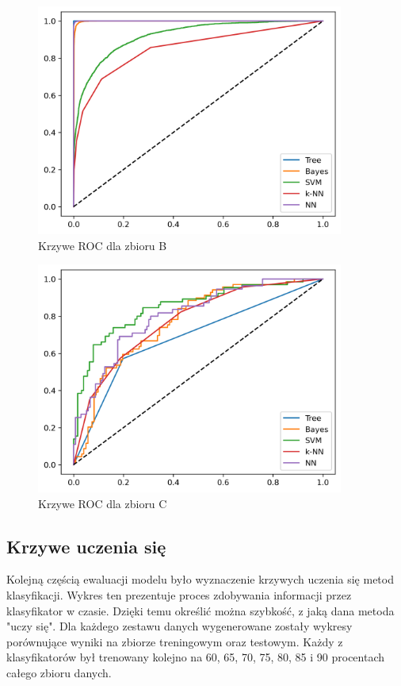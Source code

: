 \documentclass[a4paper,11pt]{article}
\begin{document}
\begin{figure}[H]
    \centering
    \includegraphics[width=0.90\textwidth]{images3/ROC_Curve_Rain.png}
    \caption{Krzywe ROC dla zbioru B}
    \label{fig:roc_curve_b}
\end{figure}

\begin{figure}[H]
    \centering
    \includegraphics[width=0.90\textwidth]{images3/ROC_Curve_Diabetes.png}
    \caption{Krzywe ROC dla zbioru C}
    \label{fig:roc_curve_c}
\end{figure}


\subsection{Krzywe uczenia się}
Kolejną częścią ewaluacji modelu było wyznaczenie krzywych uczenia się metod klasyfikacji. Wykres ten prezentuje proces zdobywania informacji przez klasyfikator w czasie. Dzięki temu określić można szybkość, z jaką dana metoda "uczy się".
Dla każdego zestawu danych wygenerowane zostały wykresy porównujące wyniki na zbiorze treningowym oraz testowym. Każdy z klasyfikatorów był trenowany kolejno na 60, 65, 70, 75, 80, 85 i 90 procentach całego zbioru danych.
\end{document}
